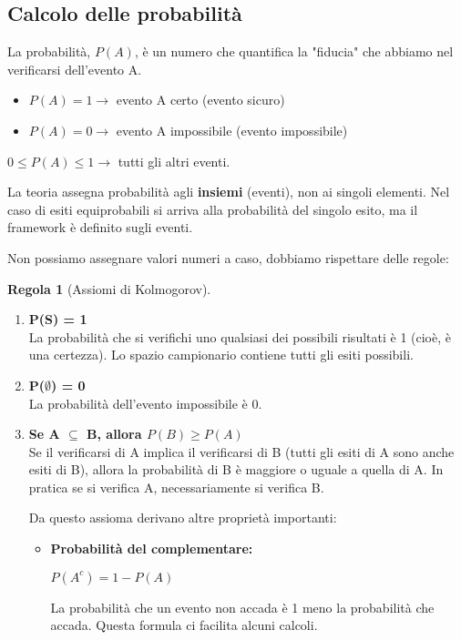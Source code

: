 \documentclass[a4paper, 11pt]{article}
\theoremstyle{definition}
\newtheorem{regola}{Regola}[section]
\begin{document}
\subsection{Calcolo delle probabilità}
La probabilità, $P(A)$, è un numero che quantifica la "fiducia" che abbiamo nel verificarsi dell'evento A.
\begin{itemize}
    \item $P(A) = 1 \rightarrow$ evento A certo (evento sicuro)
    \item $P(A) = 0 \rightarrow$ evento A impossibile (evento impossibile)
\end{itemize}
\begin{formulabox}
    $0 \le P(A) \le 1 \rightarrow$ tutti gli altri eventi.
\end{formulabox}

La teoria assegna probabilità agli \textbf{insiemi} (eventi), non ai singoli elementi. Nel caso di esiti equiprobabili si arriva alla probabilità del singolo esito, ma il framework è definito sugli eventi.

Non possiamo assegnare valori numeri a caso, dobbiamo rispettare delle regole:

\begin{regola}[Assiomi di Kolmogorov]
\
\begin{enumerate}
    \item \textbf{P(S) = 1} \\
    La probabilità che si verifichi uno qualsiasi dei possibili risultati è 1 (cioè, è una certezza). Lo spazio campionario contiene tutti gli esiti possibili.
    \item \textbf{P(\(\emptyset\)) = 0} \\
    La probabilità dell'evento impossibile è 0.
    \item \textbf{Se A \(\subseteq\) B, allora $P(B) \ge P(A)$} \\
    Se il verificarsi di A implica il verificarsi di B (tutti gli esiti di A sono anche esiti di B), allora la probabilità di B è maggiore o uguale a quella di A. In pratica se si verifica A, necessariamente si verifica B.

    Da questo assioma derivano altre proprietà importanti:
    \begin{itemize}
        \item \textbf{Probabilità del complementare:}
        \begin{formulabox}
            $P(A^c) = 1 - P(A)$
        \end{formulabox}
        La probabilità che un evento non accada è 1 meno la probabilità che accada. Questa formula ci facilita alcuni calcoli.
    \end{itemize}
\end{enumerate}
\end{regola}
\end{document}
